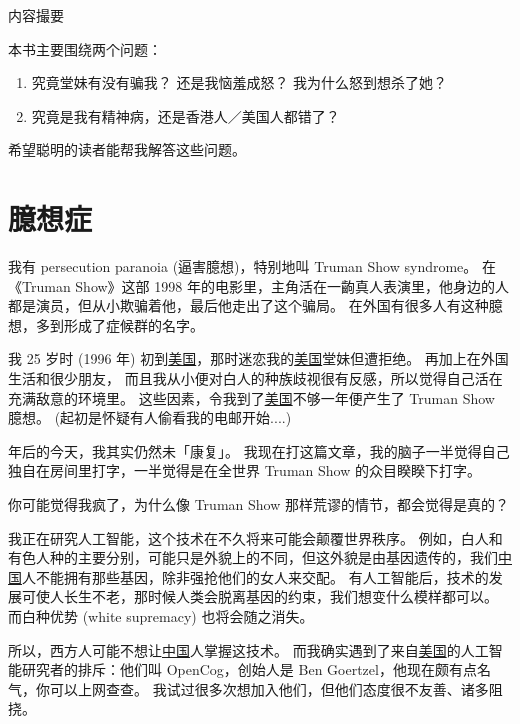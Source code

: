 \documentclass[12pt]{report}
\begin{document}
\begin{center}
{\Large 内容撮要}\par
\vspace{0.5cm}

\parbox{0.8\textwidth}{
本书主要围绕两个问题：\par

\begin{enumerate}
\item 究竟堂妹有没有骗我？ 还是我恼羞成怒？ 我为什么怒到想杀了她？ 
\item 究竟是我有精神病，还是香港人／美国人都错了？
\end{enumerate}

希望聪明的读者能帮我解答这些问题。
}
\end{center}

\dominitoc
\tableofcontents

\chapter{臆想症}

我有 persecution paranoia (逼害臆想)，特别地叫 Truman Show syndrome。 在《Truman Show》这部 1998 年的电影里，主角活在一齣真人表演里，他身边的人都是演员，但从小欺骗着他，最后他走出了这个骗局。 在外国有很多人有这种臆想，多到形成了症候群的名字。

我 25 岁时 (1996 年) 初到\uline{美国}，那时迷恋我的\uline{美国}堂妹但遭拒绝。 再加上在外国生活和很少朋友， 而且我从小便对白人的种族歧视很有反感，所以觉得自己活在充满敌意的环境里。 这些因素，令我到了\uline{美国}不够一年便产生了 Truman Show 臆想。 (起初是怀疑有人偷看我的电邮开始....)

\resultb 年后的今天，我其实仍然未「康复」。 我现在打这篇文章，我的脑子一半觉得自己独自在房间里打字，一半觉得是在全世界 Truman Show 的众目睽睽下打字。

你可能觉得我疯了，为什么像 Truman Show 那样荒谬的情节，都会觉得是真的？

我正在研究人工智能，这个技术在不久将来可能会颠覆世界秩序。 例如，白人和有色人种的主要分别，可能只是外貌上的不同，但这外貌是由基因遗传的，我们\uline{中国}人不能拥有那些基因，除非强抢他们的女人来交配。 有人工智能后，技术的发展可使人长生不老，那时候人类会脱离基因的约束，我们想变什么模样都可以。 而白种优势 (white supremacy) 也将会随之消失。

所以，西方人可能不想让\uline{中国}人掌握这技术。 而我确实遇到了来自\uline{美国}的人工智能研究者的排斥：他们叫 OpenCog，创始人是 Ben Goertzel，他现在颇有点名气，你可以上网查查。 我试过很多次想加入他们，但他们态度很不友善、诸多阻挠。
\end{document}
